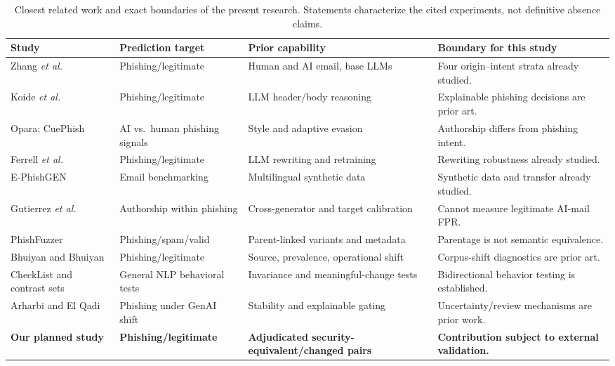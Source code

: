 \begin{table}[!htbp]
\centering
\caption{Closest related work and exact boundaries of the present research. Statements characterize the cited experiments, not definitive absence claims.}
\label{tab:related_comparison}
\footnotesize
\renewcommand{\arraystretch}{1.12}
\begin{tabularx}{\linewidth}{@{}p{2.65cm}p{2.8cm}X X@{}}
\toprule
Study & Prediction target & Prior capability & Boundary for this study\\
\midrule
Zhang \emph{et al.}~\cite{zhang2025sme} & Phishing/legitimate & Human and AI email, base LLMs & Four origin--intent strata already studied.\\
Koide \emph{et al.}~\cite{koide2026chatspamdetector} & Phishing/legitimate & LLM header/body reasoning & Explainable phishing decisions are prior art.\\
Opara; CuePhish~\cite{opara2025stylometry,commey2026cuephish} & AI vs.\ human phishing signals & Style and adaptive evasion & Authorship differs from phishing intent.\\
Ferrell \emph{et al.}~\cite{ferrell2025rephrasing} & Phishing/legitimate & LLM rewriting and retraining & Rewriting robustness already studied.\\
E-PhishGEN~\cite{pajola2025ephishgen} & Email benchmarking & Multilingual synthetic data & Synthetic data and transfer already studied.\\
Gutierrez \emph{et al.}~\cite{gutierrez2026crossmodel} & Authorship within phishing & Cross-generator and target calibration & Cannot measure legitimate AI-mail FPR.\\
PhishFuzzer~\cite{toth2026phishfuzzer} & Phishing/spam/valid & Parent-linked variants and metadata & Parentage is not semantic equivalence.\\
Bhuiyan and Bhuiyan~\cite{bhuiyan2026fragility} & Phishing/legitimate & Source, prevalence, operational shift & Corpus-shift diagnostics are prior art.\\
CheckList and contrast sets~\cite{ribeiro2020checklist,gardner2020contrast} & General NLP behavioral tests & Invariance and meaningful-change tests & Bidirectional behavior testing is established.\\
Arharbi and El Qadi~\cite{arharbi2026shifts} & Phishing under GenAI shift & Stability and explainable gating & Uncertainty/review mechanisms are prior work.\\
\textbf{Our planned study} & \textbf{Phishing/legitimate} &
\textbf{Adjudicated security-equivalent/changed pairs} &
\textbf{Contribution subject to external validation.}\\
\bottomrule
\end{tabularx}
\end{table}


